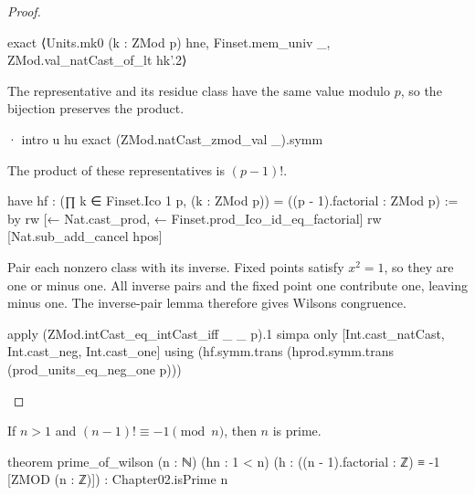 \begin{proof}
\begin{lean}
      exact ⟨Units.mk0 (k : ZMod p) hne, Finset.mem_univ _,
        ZMod.val_natCast_of_lt hk'.2⟩
  \end{lean}

  The representative and its residue class have the same value modulo $p$, so the bijection
  preserves the product.

  \begin{lean}
    · intro u hu
      exact (ZMod.natCast_zmod_val _).symm
  \end{lean}

  The product of these representatives is $(p-1)!
  $.

  \begin{lean}
    have hf : (∏ k ∈ Finset.Ico 1 p, (k : ZMod p)) = ((p - 1).factorial : ZMod p) := by
      rw [← Nat.cast_prod, ← Finset.prod_Ico_id_eq_factorial]
      rw [Nat.sub_add_cancel hpos]
  \end{lean}

  Pair each nonzero class with its inverse.
  Fixed points satisfy $x^2=1$, so they are one or minus one.
  All inverse pairs and the fixed point one contribute one, leaving minus one.
  The inverse-pair lemma therefore gives Wilson\textquotesingle s congruence.

  \begin{lean}
    apply (ZMod.intCast_eq_intCast_iff _ _ p).1
    simpa only [Int.cast_natCast, Int.cast_neg, Int.cast_one] using
      (hf.symm.trans (hprod.symm.trans (prod_units_eq_neg_one p)))
  \end{lean}
\end{proof}

\begin{theorem}
  \label{ent:thm:prime-of-wilson}
  If $n>1$ and $(n-1)!
    \equiv-1\pmod n$, then $n$ is prime.

  \begin{lean}
    theorem prime_of_wilson (n : ℕ) (hn : 1 < n)
        (h : ((n - 1).factorial : ℤ) ≡ -1 [ZMOD (n : ℤ)]) : Chapter02.isPrime n
  \end{lean}
\end{theorem}

